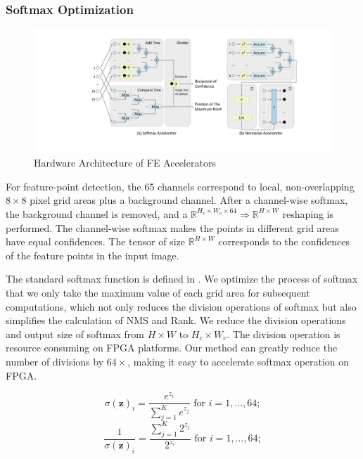 \subsubsection{Softmax Optimization}
\label{sec:softmaxopt}

\begin{figure}[t]
    \centering  
    \includegraphics[width=1\linewidth]{fig/FEaccelerator.pdf}
    \caption{Hardware Architecture of FE Accelerators}
    \label{fig:FEaccelerator}
\end{figure}

For feature-point detection, the 65 channels correspond to local, non-overlapping $8 \times 8$ pixel grid areas plus a background channel. 
After a channel-wise softmax, the background channel is removed, and a $\mathbb{R}^{H_c\times W_c\times64}\Rightarrow \mathbb{R}^{H\times W}$ reshaping is performed. 
The channel-wise softmax makes the points in different grid areas have equal confidences.
The tensor of size $\mathbb{R}^{H\times W}$ corresponds to the confidences of the feature points in the input image.

The standard softmax function is defined in .
We optimize the process of softmax that we only take the maximum value of each grid area for subsequent computations, which not only reduces the division operations of softmax but also simplifies the calculation of NMS and Rank.
We reduce the division operations and output size of softmax from $H \times W$ to $H_c \times W_c$.
The division operation is resource consuming on FPGA platforms. 
Our method can greatly reduce the number of divisions by $64 \times$, making it easy to accelerate softmax operation on FPGA.

\begin{equation}
    \sigma (\mathbf {z} )_{i}={\frac {e^{z_{i}}}{\sum _{j=1}^{K}e^{z_{j}}}}{\text{ for }}i=1,\dotsc ,64;
    \label{equ:softmax_o}
\end{equation}
\begin{equation}
    \frac{1}{\sigma (\mathbf {z} )_{i}}={\frac {\sum _{j=1}^{K}2^{z_{j}}}{2^{z_{i}}}}{\text{ for }}i=1,\dotsc ,64;
    \label{equ:softmax_hard}
\end{equation}

